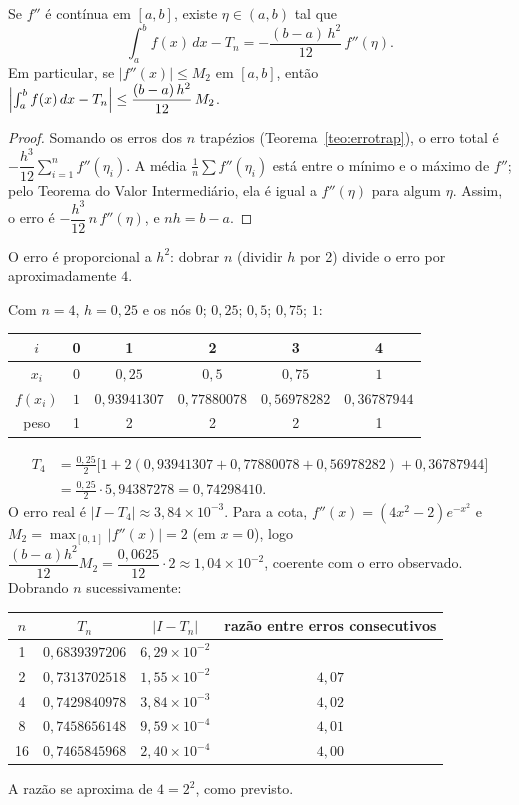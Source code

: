 \begin{teorema}\label{teo:errotrapr}
Se $f''$ é contínua em $[a,b]$, existe $\eta\in(a,b)$ tal que
\[
\int_a^b f(x)\,dx-T_n=-\frac{(b-a)\,h^2}{12}\,f''(\eta).
\]
Em particular, se $|f''(x)|\le M_2$ em $[a,b]$, então
$\Bigl|\int_a^b f(x)\,dx-T_n\Bigr|\le\dfrac{(b-a)\,h^2}{12}\,M_2$.
\end{teorema}

\begin{proof}
Somando os erros dos $n$ trapézios (Teorema~\ref{teo:errotrap}), o erro total é
$-\dfrac{h^3}{12}\sum_{i=1}^{n}f''(\eta_i)$. A média
$\frac1n\sum f''(\eta_i)$ está entre o mínimo e o máximo de $f''$; pelo Teorema do Valor
Intermediário, ela é igual a $f''(\eta)$ para algum $\eta$. Assim, o erro é
$-\dfrac{h^3}{12}\,n\,f''(\eta)$, e $nh=b-a$.
\end{proof}

O erro é proporcional a $h^2$: dobrar $n$ (dividir $h$ por 2) divide o erro por
aproximadamente $4$.

\begin{exemplo}
Com $n=4$, $h=0{,}25$ e os nós $0$; $0{,}25$; $0{,}5$; $0{,}75$; $1$:
\begin{center}
\renewcommand{\arraystretch}{1.3}
\begin{tabular}{c|ccccc}
$i$ & 0 & 1 & 2 & 3 & 4\\ \hline
$x_i$ & $0$ & $0{,}25$ & $0{,}5$ & $0{,}75$ & $1$\\
$f(x_i)$ & $1$ & $0{,}93941307$ & $0{,}77880078$ & $0{,}56978282$ & $0{,}36787944$\\
peso & 1 & 2 & 2 & 2 & 1
\end{tabular}
\end{center}
\begin{align*}
T_4&=\frac{0{,}25}{2}\bigl[1+2(0{,}93941307+0{,}77880078+0{,}56978282)+0{,}36787944\bigr]\\
&=\frac{0{,}25}{2}\cdot5{,}94387278=0{,}74298410.
\end{align*}
O erro real é $|I-T_4|\approx3{,}84\times10^{-3}$. Para a cota, $f''(x)=(4x^2-2)e^{-x^2}$
e $M_2=\max_{[0,1]}|f''(x)|=2$ (em $x=0$), logo
$\dfrac{(b-a)h^2}{12}M_2=\dfrac{0{,}0625}{12}\cdot2\approx1{,}04\times10^{-2}$, coerente com o
erro observado. Dobrando $n$ sucessivamente:
\begin{center}
\renewcommand{\arraystretch}{1.3}
\begin{tabular}{c|c|c|c}
$n$ & $T_n$ & $|I-T_n|$ & razão entre erros consecutivos\\ \hline
1 & $0{,}6839397206$ & $6{,}29\times10^{-2}$ & \\
2 & $0{,}7313702518$ & $1{,}55\times10^{-2}$ & $4{,}07$\\
4 & $0{,}7429840978$ & $3{,}84\times10^{-3}$ & $4{,}02$\\
8 & $0{,}7458656148$ & $9{,}59\times10^{-4}$ & $4{,}01$\\
16 & $0{,}7465845968$ & $2{,}40\times10^{-4}$ & $4{,}00$
\end{tabular}
\end{center}
A razão se aproxima de $4=2^2$, como previsto.
\end{exemplo}

